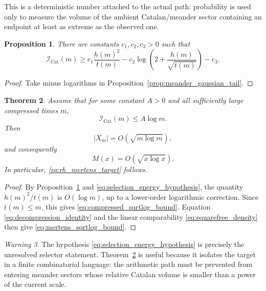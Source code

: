 \documentclass[11pt]{amsart}
\numberwithin{equation}{section}
\theoremstyle{plain}
\newtheorem{theorem}{Theorem}[section]
\newtheorem{proposition}[theorem]{Proposition}
\theoremstyle{definition}
\theoremstyle{remark}
\newtheorem{warning}[theorem]{Warning}
\newcommand{\Mert}{M}
\newcommand{\Icat}{\mathcal{I}_{\mathrm{Cat}}}
\begin{document}
This is a deterministic number attached to the actual path: probability is used only to measure the volume of the ambient Catalan/meander sector containing an endpoint at least as extreme as the observed one.

\begin{proposition}
\label{prop:selection_energy_lower_bound}
There are constants $c_1,c_2,c_3>0$ such that
\begin{equation}
\Icat(m)
\ge
c_1\frac{h(m)^2}{t(m)}
-c_2\log\!\left(2+\frac{h(m)}{\sqrt{t(m)}}\right)
-c_3.
\label{eq:selection_energy_lower_bound}
\end{equation}
\end{proposition}

\begin{proof}
Take minus logarithms in Proposition~\ref{prop:meander_gaussian_tail}.
\end{proof}

\begin{theorem}
\label{thm:selection_energy_implies_rh_scale}
Assume that for some constant $A>0$ and all sufficiently large compressed times $m$,
\begin{equation}
\Icat(m)\le A\log m.
\label{eq:selection_energy_hypothesis}
\end{equation}
Then
\begin{equation}
|X_m|=O\!\left(\sqrt{m\log m}\right),
\label{eq:compressed_sqrtlog_bound}
\end{equation}
and consequently
\begin{equation}
\Mert(x)=O\!\left(\sqrt{x\log x}\right).
\label{eq:mertens_sqrtlog_bound}
\end{equation}
In particular, \eqref{eq:rh_mertens_target} follows.
\end{theorem}

\begin{proof}
By Proposition~\ref{prop:selection_energy_lower_bound} and \eqref{eq:selection_energy_hypothesis}, the quantity $h(m)^2/t(m)$ is $O(\log m)$, up to a lower-order logarithmic correction.  Since $t(m)\le m$, this gives \eqref{eq:compressed_sqrtlog_bound}.  Equation \eqref{eq:decompression_identity} and the linear comparability \eqref{eq:squarefree_density} then give \eqref{eq:mertens_sqrtlog_bound}.
\end{proof}

\begin{warning}
\label{warn:selection_energy_is_the_wall}
The hypothesis \eqref{eq:selection_energy_hypothesis} is precisely the unresolved selector statement.  Theorem~\ref{thm:selection_energy_implies_rh_scale} is useful because it isolates the target in a finite combinatorial language: the arithmetic path must be prevented from entering meander sectors whose relative Catalan volume is smaller than a power of the current scale.
\end{warning}
\end{document}
